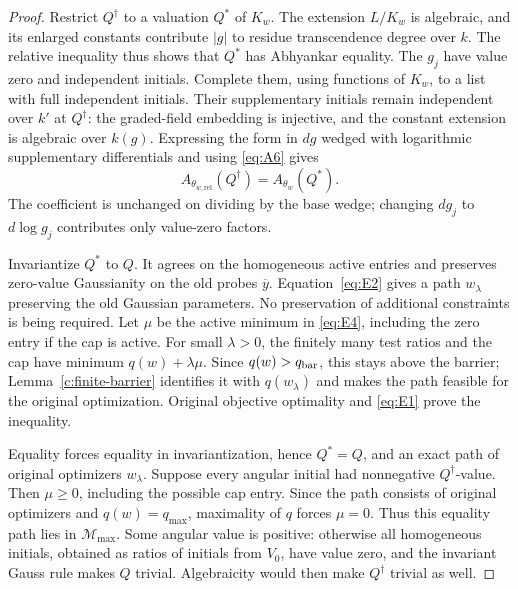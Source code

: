 \begin{proof}
Restrict \(Q^\dagger\) to a valuation \(Q^*\) of \(K_w\).
The extension \(L/K_w\) is algebraic, and its enlarged constants
contribute \(|g|\) to residue transcendence degree over \(k\).
The relative inequality thus shows that \(Q^*\) has Abhyankar
equality.  The \(g_j\) have value zero and independent initials.
Complete them, using functions of \(K_w\), to a list with full
independent initials.  Their supplementary initials remain
independent over \(k'\) at \(Q^\dagger\): the graded-field
embedding is injective, and the constant extension is algebraic
over \(k(g)\).  Expressing the form in \(dg\) wedged with
logarithmic supplementary differentials and using \eqref{eq:A6}
gives
\[
             A_{\theta_{w,\mathrm{rel}}}(Q^\dagger)
                              =A_{\theta_w}(Q^*).
\]
The coefficient is unchanged on dividing by the base wedge;
changing \(dg_j\) to \(d\log g_j\) contributes only value-zero
factors.

Invariantize \(Q^*\) to \(Q\).  It agrees on the homogeneous
active entries and preserves zero-value Gaussianity on the old
probes \(\overline y\).  Equation~\eqref{eq:E2} gives a path
\(w_\lambda\) preserving the old Gaussian parameters.  No
preservation of additional constraints is being required.  Let \(\mu\) be the
active minimum in \eqref{eq:E4}, including the zero entry if the
cap is active.  For small \(\lambda>0\), the finitely many test
ratios and the cap have minimum \(q(w)+\lambda\mu\).
Since \(q(w)>q_{\rm bar}\), this stays above the barrier;
Lemma~\ref{c:finite-barrier} identifies it with \(q(w_\lambda)\)
and makes the path feasible for the original optimization.
Original objective optimality and \eqref{eq:E1} prove the inequality.

Equality forces equality in invariantization, hence \(Q^*=Q\),
and an exact path of original optimizers \(w_\lambda\).
Suppose every angular initial had nonnegative \(Q^\dagger\)-value.
Then \(\mu\ge0\), including the possible cap entry.
Since the path consists of original optimizers and
\(q(w)=q_{\max}\), maximality of \(q\) forces \(\mu=0\).
Thus this equality path lies in \(\mathcal M_{\max}\).
Some angular value is positive:
otherwise all homogeneous initials, obtained as ratios of initials
from \(V_0\), have value zero, and the invariant Gauss rule makes
\(Q\) trivial.  Algebraicity would then make \(Q^\dagger\)
trivial as well.


\end{proof}
